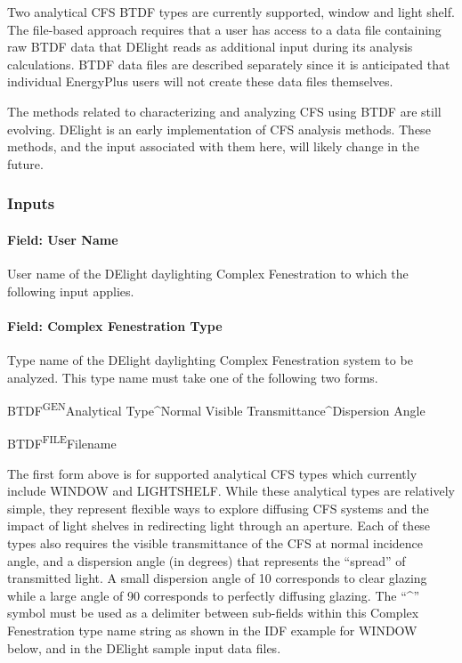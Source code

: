 Two analytical CFS BTDF types are currently supported, window and light shelf. The file-based approach requires that a user has access to a data file containing raw BTDF data that DElight reads as additional input during its analysis calculations. BTDF data files are described separately since it is anticipated that individual EnergyPlus users will not create these data files themselves.

The methods related to characterizing and analyzing CFS using BTDF are still evolving. DElight is an early implementation of CFS analysis methods. These methods, and the input associated with them here, will likely change in the future.

\subsubsection{Inputs}\label{inputs-3-007}

\paragraph{Field: User Name}\label{field-user-name}

User name of the DElight daylighting Complex Fenestration to which the following input applies.

\paragraph{Field: Complex Fenestration Type}\label{field-complex-fenestration-type}

Type name of the DElight daylighting Complex Fenestration system to be analyzed. This type name must take one of the following two forms.

BTDF\textsuperscript{GEN}Analytical Type\^{}Normal Visible Transmittance\^{}Dispersion Angle

BTDF\textsuperscript{FILE}Filename

The first form above is for supported analytical CFS types which currently include WINDOW and LIGHTSHELF. While these analytical types are relatively simple, they represent flexible ways to explore diffusing CFS systems and the impact of light shelves in redirecting light through an aperture. Each of these types also requires the visible transmittance of the CFS at normal incidence angle, and a dispersion angle (in degrees) that represents the ``spread'' of transmitted light. A small dispersion angle of 10 corresponds to clear glazing while a large angle of 90 corresponds to perfectly diffusing glazing. The ``\^{}'' symbol must be used as a delimiter between sub-fields within this Complex Fenestration type name string as shown in the IDF example for WINDOW below, and in the DElight sample input data files.

